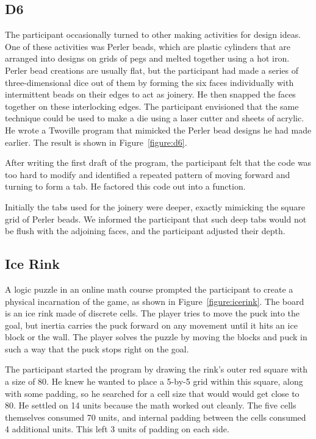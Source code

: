 \subsection{D6}

The participant occasionally turned to other making activities for design ideas. One of these activities was Perler beads, which are plastic cylinders that are arranged into designs on grids of pegs and melted together using a hot iron. Perler bead creations are usually flat, but the participant had made a series of three-dimensional dice out of them by forming the six faces individually with intermittent beads on their edges to act as joinery. He then snapped the faces together on these interlocking edges. The participant envisioned that the same technique could be used to make a die using a laser cutter and sheets of acrylic. He wrote a Twoville program that mimicked the Perler bead designs he had made earlier. The result is shown in Figure~\ref{figure:d6}.

After writing the first draft of the program, the participant felt that the code was too hard to modify and identified a repeated pattern of moving forward and turning to form a tab. He factored this code out into a function.

Initially the tabs used for the joinery were deeper, exactly mimicking the square grid of Perler beads. We informed the participant that such deep tabs would not be flush with the adjoining faces, and the participant adjusted their depth.

\subsection{Ice Rink}

A logic puzzle in an online math course prompted the participant to create a physical incarnation of the game, as shown in Figure~\ref{figure:icerink}. The board is an ice rink made of discrete cells. The player tries to move the puck into the goal, but inertia carries the puck forward on any movement until it hits an ice block or the wall. The player solves the puzzle by moving the blocks and puck in such a way that the puck stops right on the goal.

The participant started the program by drawing the rink's outer red square with a size of 80. He knew he wanted to place a 5-by-5 grid within this square, along with some padding, so he searched for a cell size that would would get close to 80. He settled on 14 units because the math worked out cleanly. The five cells themselves consumed 70 units, and internal padding between the cells consumed 4 additional units. This left 3 units of padding on each side.

